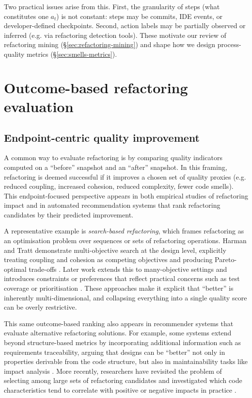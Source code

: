 Two practical issues arise from this. First, the granularity of steps (what constitutes one $a_t$) is not constant: steps may be commits, IDE events, or developer-defined checkpoints. Second, action labels may be partially observed or inferred (e.g. via refactoring detection tools). These motivate our review of refactoring mining (\S\ref{sec:refactoring-mining}) and shape how we design process-quality metrics (\S\ref{sec:smells-metrics}).

\section{Outcome-based refactoring evaluation}
\label{sec:outcome-eval}

\subsection{Endpoint-centric quality improvement}
A common way to evaluate refactoring is by comparing quality indicators computed on a ``before'' snapshot and an ``after'' snapshot. In this framing, refactoring is deemed successful if it improves a chosen set of quality proxies (e.g. reduced coupling, increased cohesion, reduced complexity, fewer code smells). This endpoint-focused perspective appears in both empirical studies of refactoring impact and in automated recommendation systems that rank refactoring candidates by their predicted improvement.

A representative example is \emph{search-based refactoring}, which frames refactoring as an optimisation problem over sequences or sets of refactoring operations. Harman and Tratt demonstrate multi-objective search at the design level, explicitly treating coupling and cohesion as competing objectives and producing Pareto-optimal trade-offs \cite{harman2007pareto}. Later work extends this to many-objective settings and introduces constraints or preferences that reflect practical concerns such as test coverage or prioritisation \cite{mohan2019manyobjective}. These approaches make it explicit that ``better'' is inherently multi-dimensional, and collapsing everything into a single quality score can be overly restrictive.

This same outcome-based ranking also appears in recommender systems that evaluate alternative refactoring solutions. For example, some systems extend beyond structure-based metrics by incorporating additional information such as requirements traceability, arguing that designs can be ``better'' not only in properties derivable from the code structure, but also in maintainability tasks like impact analysis \cite{wang2018traceability}. More recently, researchers have revisited the problem of selecting among large sets of refactoring candidates and investigated which code characteristics tend to correlate with positive or negative impacts in practice \cite{nikolaidis2024metricsbased}.

